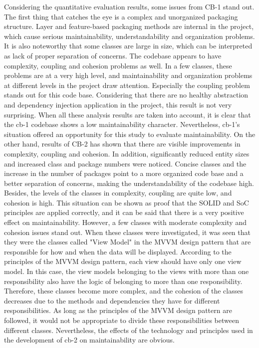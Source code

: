 Considering the quantitative evaluation results, some issues from CB-1 stand out. The first thing that catches the eye is a complex and unorganized packaging structure. Layer and feature-based packaging methods are internal in the project, which cause serious maintainability, understandability and organization problems. It is also noteworthy that some classes are large in size, which can be interpreted as lack of proper separation of concerns. The codebase appears to have complexity, coupling and cohesion problems as well. In a few classes, these problems are at a very high level, and maintainability and organization problems at different levels in the project draw attention. Especially the coupling problem stands out for this code base. Considering that there are no healthy abstraction and dependency injection application in the project, this result is not very surprising. When all these analysis results are taken into account, it is clear that the cb-1 codebase shows a low maintainability character. Nevertheless, cb-1's situation offered an opportunity for this study to evaluate maintainability. On the other hand, results of CB-2 has shown that there are visible improvements in complexity, coupling and cohesion. In addition, significantly reduced entity sizes and increased class and package numbers were noticed. Concise classes and the increase in the number of packages point to a more organized code base and a better separation of concerns, making the understandability of the codebase high. Besides, the levels of the classes in complexity, coupling are quite low, and cohesion is high. This situation can be shown as proof that the SOLID and SoC principles are applied correctly, and it can be said that there is a very positive effect on maintainability. However, a few classes with moderate complexity and cohesion issues stand out. When these classes were investigated, it was seen that they were the classes called "View Model" in the MVVM design pattern that are responsible for how and when the data will be displayed. According to the principles of the MVVM design pattern, each view should have only one view model. In this case, the view models belonging to the views with more than one responsibility also have the logic of belonging to more than one responsibility. Therefore, these classes become more complex, and the cohesion of the classes decreases due to the methods and dependencies they have for different responsibilities. As long as the principles of the MVVM design pattern are followed, it would not be appropriate to divide these responsibilities between different classes. Nevertheless, the effects of the technology and principles used in the development of cb-2 on maintainability are obvious.

